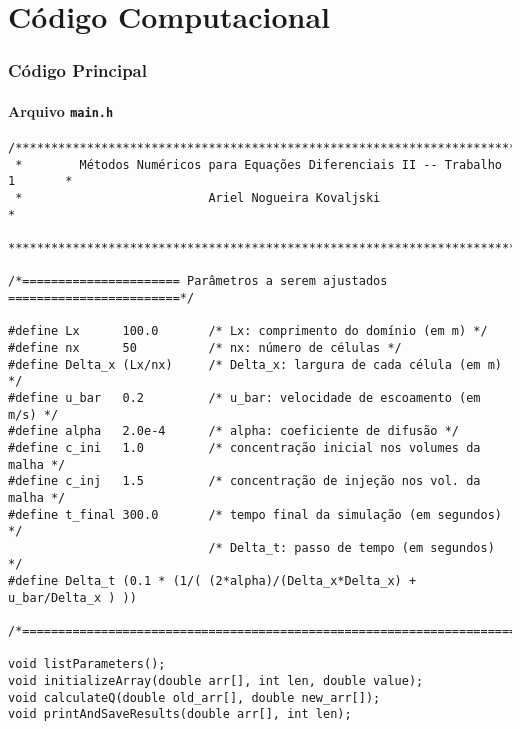 \chapter{Código Computacional}

\subsection{Código Principal}

\subsubsection{Arquivo \texttt{main.h}}

\begin{Verbatim}[fontsize=\footnotesize]
/******************************************************************************
 *        Métodos Numéricos para Equações Diferenciais II -- Trabalho 1       *
 *                          Ariel Nogueira Kovaljski                          *
 ******************************************************************************/

/*====================== Parâmetros a serem ajustados ========================*/

#define Lx      100.0       /* Lx: comprimento do domínio (em m) */
#define nx      50          /* nx: número de células */
#define Delta_x (Lx/nx)     /* Delta_x: largura de cada célula (em m) */
#define u_bar   0.2         /* u_bar: velocidade de escoamento (em m/s) */
#define alpha   2.0e-4      /* alpha: coeficiente de difusão */
#define c_ini   1.0         /* concentração inicial nos volumes da malha */
#define c_inj   1.5         /* concentração de injeção nos vol. da malha */
#define t_final 300.0       /* tempo final da simulação (em segundos) */
                            /* Delta_t: passo de tempo (em segundos) */
#define Delta_t (0.1 * (1/( (2*alpha)/(Delta_x*Delta_x) + u_bar/Delta_x ) ))

/*============================================================================*/

void listParameters();
void initializeArray(double arr[], int len, double value);
void calculateQ(double old_arr[], double new_arr[]);
void printAndSaveResults(double arr[], int len);
\end{Verbatim}

